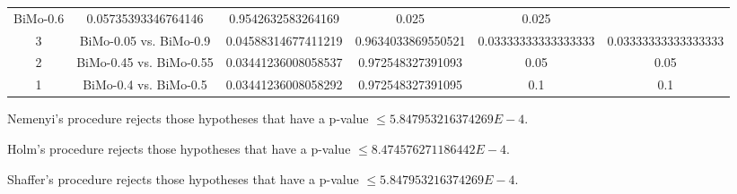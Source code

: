 \documentclass[a4paper,10pt]{article}
\begin{document}
\begin{landscape}
\begin{table}[!htp]
\begin{tabular}{cccccc}
BiMo-0.6&0.05735393346764146&0.9542632583264169&0.025&0.025\\3&BiMo-0.05 vs. BiMo-0.9&0.04588314677411219&0.9634033869550521&0.03333333333333333&0.03333333333333333\\2&BiMo-0.45 vs. BiMo-0.55&0.03441236008058537&0.972548327391093&0.05&0.05\\1&BiMo-0.4 vs. BiMo-0.5&0.03441236008058292&0.972548327391095&0.1&0.1\\\hline
\end{tabular}
\end{table}
Nemenyi's procedure rejects those hypotheses that have a p-value $\le5.847953216374269E-4$.


Holm's procedure rejects those hypotheses that have a p-value $\le8.474576271186442E-4$.


Shaffer's procedure rejects those hypotheses that have a p-value $\le5.847953216374269E-4$.



\end{landscape}
\end{document}
